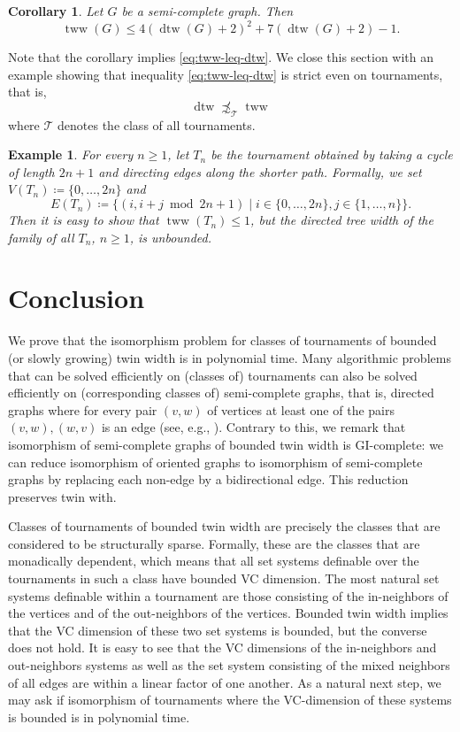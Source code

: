 \PassOptionsToPackage{dvipsnames,svgnames}{xcolor}\documentclass[10pt,a4paper]{article}
\newtheorem{corollary}{Corollary}[section]
\newtheorem{example}{Example}[section]
\newcommand{\CT}{{\mathcal T}}
\newcommand{\bigmid}{\;\big|\;}
\DeclareMathOperator{\dtw}{dtw}
\DeclareMathOperator{\tww}{tww}
\begin{document}
\begin{corollary}
 \label{cor:tww-vs-dtw}
 Let $G$ be a semi-complete graph.
 Then
 \[\tww(G) \leq 4(\dtw(G) + 2)^2 + 7(\dtw(G) + 2) - 1.\]
\end{corollary}

Note that the corollary implies \eqref{eq:tww-leq-dtw}.
We close this section with an example showing that inequality \eqref{eq:tww-leq-dtw} is strict even on tournaments, that is,
\[\dtw\not\precsim_{\CT}\tww\]
where $\CT$ denotes the class of all tournaments.

\begin{example}
 For every $n \geq 1$, let $T_n$ be the tournament obtained by taking a cycle of length $2n+1$ and directing edges along the shorter path.
 Formally, we set $V(T_n) \coloneqq \{0,\dots,2n\}$ and
 \[E(T_n) \coloneqq \big\{ (i,i+j \bmod{2n+1}) \bigmid i \in \{0,\dots,2n\}, j \in \{1,\dots,n\}\big\}.\]
 Then it is easy to show that $\tww(T_n) \leq 1$, but the directed tree width of the family of all $T_n$, $n \geq 1$, is unbounded.
\end{example}


\section{Conclusion}

We prove that the isomorphism problem for classes of tournaments of bounded (or slowly growing) twin width is in polynomial time.
Many algorithmic problems that can be solved efficiently on (classes of) tournaments can also be solved efficiently on (corresponding classes of) semi-complete graphs, that is, directed graphs where for every pair $(v,w)$ of vertices at least one of the pairs $(v,w),(w,v)$ is an edge (see, e.g., \cite{Pilipczuk13}).
Contrary to this, we remark that isomorphism of semi-complete graphs of bounded twin width is GI-complete:
we can reduce isomorphism of oriented graphs to isomorphism of semi-complete graphs by replacing each non-edge by a bidirectional edge.
This reduction preserves twin with.

Classes of tournaments of bounded twin width are precisely the classes that are considered to be structurally sparse.
Formally, these are the classes that are monadically dependent, which means that all set systems definable over the tournaments in such a class have bounded VC dimension.
The most natural set systems definable within a tournament are those consisting of the in-neighbors of the vertices and of the out-neighbors of the vertices.
Bounded twin width implies that the VC dimension of these two set systems is bounded, but the converse does not hold.
It is easy to see that the VC dimensions of the in-neighbors and out-neighbors systems as well as the set system consisting of the mixed neighbors of all edges are within a linear factor of one another.
As a natural next step, we may ask if isomorphism of tournaments where the VC-dimension of these systems is bounded is in polynomial time.




\end{document}
